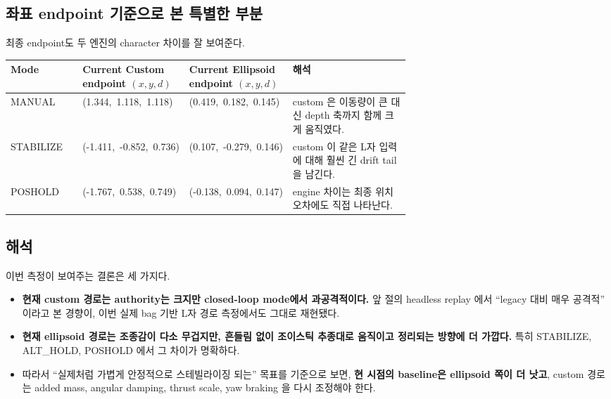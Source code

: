 \documentclass[11pt,a4paper]{article}
\begin{document}
\subsection{좌표 endpoint 기준으로 본 특별한 부분}

최종 endpoint도 두 엔진의 character 차이를 잘 보여준다.

\begin{center}
\small
\begin{tabularx}{\linewidth}{>{\raggedright\arraybackslash}p{0.18\linewidth}>{\raggedright\arraybackslash}p{0.24\linewidth}>{\raggedright\arraybackslash}p{0.24\linewidth}Y}
\toprule
Mode & Current Custom endpoint $(x,y,d)$ & Current Ellipsoid endpoint $(x,y,d)$ & 해석 \\
\midrule
MANUAL & (1.344,\ 1.118,\ 1.118) & (0.419,\ 0.182,\ 0.145) & custom 은 이동량이 큰 대신 depth 축까지 함께 크게 움직였다. \\
STABILIZE & (-1.411,\ -0.852,\ 0.736) & (0.107,\ -0.279,\ 0.146) & custom 이 같은 L자 입력에 대해 훨씬 긴 drift tail 을 남긴다. \\
POSHOLD & (-1.767,\ 0.538,\ 0.749) & (-0.138,\ 0.094,\ 0.147) & engine 차이는 최종 위치 오차에도 직접 나타난다. \\
\bottomrule
\end{tabularx}
\end{center}

\subsection{해석}

이번 측정이 보여주는 결론은 세 가지다.

\begin{itemize}[leftmargin=2em]
  \item \textbf{현재 custom 경로는 authority는 크지만 closed-loop mode에서 과공격적이다.} 앞 절의 headless replay 에서 ``legacy 대비 매우 공격적'' 이라고 본 경향이, 이번 실제 bag 기반 L자 경로 측정에서도 그대로 재현됐다.
  \item \textbf{현재 ellipsoid 경로는 조종감이 다소 무겁지만, 흔들림 없이 조이스틱 추종대로 움직이고 정리되는 방향에 더 가깝다.} 특히 STABILIZE, ALT\_HOLD, POSHOLD 에서 그 차이가 명확하다.
  \item 따라서 ``실제처럼 가볍게 안정적으로 스테빌라이징 되는'' 목표를 기준으로 보면, \textbf{현 시점의 baseline은 ellipsoid 쪽이 더 낫고}, custom 경로는 added mass, angular damping, thrust scale, yaw braking 을 다시 조정해야 한다.
\end{itemize}
\end{document}
